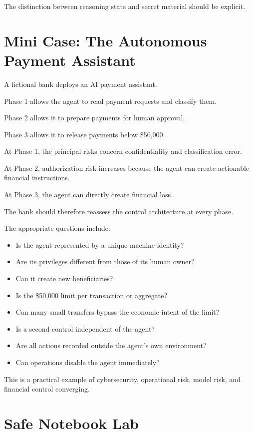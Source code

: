 The distinction between reasoning state and secret material should be explicit.

\section{Mini Case: The Autonomous Payment Assistant}

A fictional bank deploys an AI payment assistant.

Phase 1 allows the agent to read payment requests and classify them.

Phase 2 allows it to prepare payments for human approval.

Phase 3 allows it to release payments below \$50,000.

At Phase 1, the principal risks concern confidentiality and classification error.

At Phase 2, authorization risk increases because the agent can create actionable financial instructions.

At Phase 3, the agent can directly create financial loss.

The bank should therefore reassess the control architecture at every phase.

The appropriate questions include:

\begin{itemize}
    \item Is the agent represented by a unique machine identity?
    \item Are its privileges different from those of its human owner?
    \item Can it create new beneficiaries?
    \item Is the \$50,000 limit per transaction or aggregate?
    \item Can many small transfers bypass the economic intent of the limit?
    \item Is a second control independent of the agent?
    \item Are all actions recorded outside the agent's own environment?
    \item Can operations disable the agent immediately?
\end{itemize}

This is a practical example of cybersecurity, operational risk, model risk, and financial control converging.

\section{Safe Notebook Lab}

